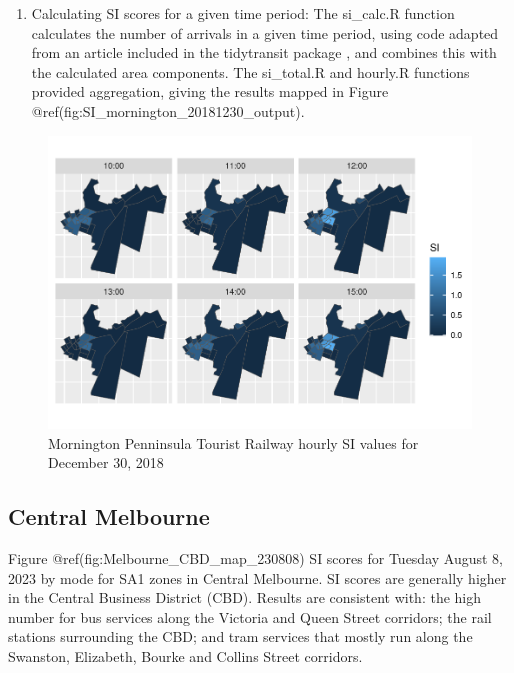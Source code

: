 \documentclass[preprint, 3p,
authoryear]{elsarticle} %
\providecommand{\tightlist}{%
  \setlength{\itemsep}{0pt}\setlength{\parskip}{0pt}}
\begin{document}
\begin{enumerate}
\def\labelenumi{(\arabic{enumi})}
\setcounter{enumi}{3}
\tightlist
\item
  Calculating SI scores for a given time period: The si\_calc.R function
  calculates the number of arrivals in a given time period, using code
  adapted from an article included in the tidytransit package
  \citep{tidytransit_departure_timetable}, and combines this with the
  calculated area components. The si\_total.R and hourly.R functions
  provided aggregation, giving the results mapped in Figure
  @ref(fig:SI\_mornington\_20181230\_output).
\end{enumerate}

\begin{figure}
\centering
\includegraphics{Leveraging_GTFS_to_assess_transit_supply_Transport_Geography_files/figure-latex/SI_mornington_20181230_output-1.pdf}
\caption{Mornington Penninsula Tourist Railway hourly SI values for
December 30, 2018}
\end{figure}

\hypertarget{central-melbourne}{%
\subsection{Central Melbourne}\label{central-melbourne}}

Figure @ref(fig:Melbourne\_CBD\_map\_230808) SI scores for Tuesday
August 8, 2023 by mode for SA1 zones in Central Melbourne. SI scores are
generally higher in the Central Business District (CBD). Results are
consistent with: the high number for bus services along the Victoria and
Queen Street corridors; the rail stations surrounding the CBD; and tram
services that mostly run along the Swanston, Elizabeth, Bourke and
Collins Street corridors.
\end{document}
